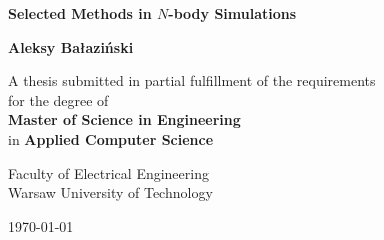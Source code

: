 \documentclass{report}
\newcommand{\blankpageifneeded}{
  \newpage
  \ifodd\value{page}
  \else
  \thispagestyle{empty}
  \null
  \newpage
  \addtocounter{page}{-1}
  \fi
}
\newcommand{\blankpage}{
  \newpage
  \thispagestyle{empty}
  \null
  \newpage
  \addtocounter{page}{-1}
}
\begin{document}
\newcommand{\PThreeM}{P$^3$M}
\begin{titlepage}
  \centering
  \vspace*{2cm}

  {\Huge\bfseries Selected Methods in $N$-body Simulations\par}
  \vspace{1.5cm}

  {\Large\bfseries Aleksy Bałaziński\par}
  \vspace{1.5cm}

  {\large
    A thesis submitted in partial fulfillment of the requirements\\
    for the degree of\\
    \textbf{Master of Science in Engineering}\\
    in \textbf{Applied Computer Science}\par
  }
  \vspace{0.5cm}

  {\large
    Faculty of Electrical Engineering\\
    Warsaw University of Technology
    \par}

  \vfill

  {\large \today\par}
  \thispagestyle{empty}
\end{titlepage}

\blankpage


\blankpage
{}


\blankpage
{}
\tableofcontents

\blankpageifneeded













\appendix

\end{document}
